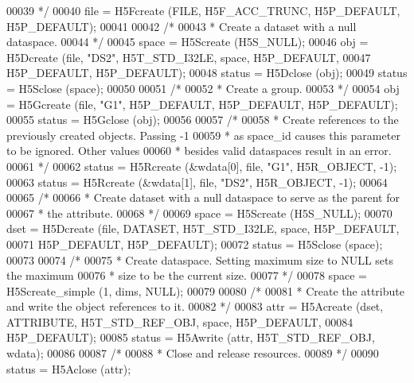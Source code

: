 \begin{DoxyCode}
00039 \textcolor{comment}{     */}
00040     file = H5Fcreate (FILE, H5F\_ACC\_TRUNC, H5P\_DEFAULT, H5P\_DEFAULT);
00041 
00042     \textcolor{comment}{/*}
00043 \textcolor{comment}{     * Create a dataset with a null dataspace.}
00044 \textcolor{comment}{     */}
00045     space = H5Screate (H5S\_NULL);
00046     obj = H5Dcreate (file, \textcolor{stringliteral}{"DS2"}, H5T\_STD\_I32LE, space, H5P\_DEFAULT,
00047                 H5P\_DEFAULT, H5P\_DEFAULT);
00048     status = H5Dclose (obj);
00049     status = H5Sclose (space);
00050 
00051     \textcolor{comment}{/*}
00052 \textcolor{comment}{     * Create a group.}
00053 \textcolor{comment}{     */}
00054     obj = H5Gcreate (file, \textcolor{stringliteral}{"G1"}, H5P\_DEFAULT, H5P\_DEFAULT, H5P\_DEFAULT);
00055     status = H5Gclose (obj);
00056 
00057     \textcolor{comment}{/*}
00058 \textcolor{comment}{     * Create references to the previously created objects.  Passing -1}
00059 \textcolor{comment}{     * as space\_id causes this parameter to be ignored.  Other values}
00060 \textcolor{comment}{     * besides valid dataspaces result in an error.}
00061 \textcolor{comment}{     */}
00062     status = H5Rcreate (&wdata[0], file, \textcolor{stringliteral}{"G1"}, H5R\_OBJECT, -1);
00063     status = H5Rcreate (&wdata[1], file, \textcolor{stringliteral}{"DS2"}, H5R\_OBJECT, -1);
00064 
00065     \textcolor{comment}{/*}
00066 \textcolor{comment}{     * Create dataset with a null dataspace to serve as the parent for}
00067 \textcolor{comment}{     * the attribute.}
00068 \textcolor{comment}{     */}
00069     space = H5Screate (H5S\_NULL);
00070     dset = H5Dcreate (file, DATASET, H5T\_STD\_I32LE, space, H5P\_DEFAULT,
00071                 H5P\_DEFAULT, H5P\_DEFAULT);
00072     status = H5Sclose (space);
00073 
00074     \textcolor{comment}{/*}
00075 \textcolor{comment}{     * Create dataspace.  Setting maximum size to NULL sets the maximum}
00076 \textcolor{comment}{     * size to be the current size.}
00077 \textcolor{comment}{     */}
00078     space = H5Screate\_simple (1, dims, NULL);
00079 
00080     \textcolor{comment}{/*}
00081 \textcolor{comment}{     * Create the attribute and write the object references to it.}
00082 \textcolor{comment}{     */}
00083     attr = H5Acreate (dset, ATTRIBUTE, H5T\_STD\_REF\_OBJ, space, H5P\_DEFAULT,
00084                     H5P\_DEFAULT);
00085     status = H5Awrite (attr, H5T\_STD\_REF\_OBJ, wdata);
00086 
00087     \textcolor{comment}{/*}
00088 \textcolor{comment}{     * Close and release resources.}
00089 \textcolor{comment}{     */}
00090     status = H5Aclose (attr);

\end{DoxyCode}
